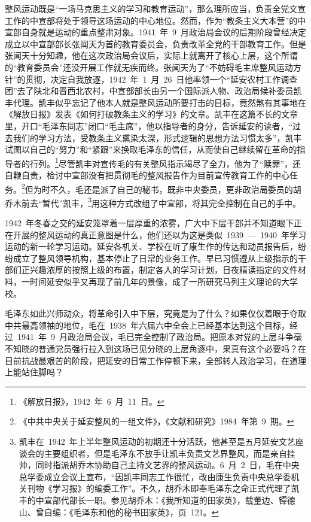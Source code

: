 整风运动既是“一场马克思主义的学习和教育运动”，那么理所应当，负责全党文宣工作的中宣部将处于领导这场运动的中心地位。然而，作为“教条主义大本营”的中宣部自身就是运动的重点整肃对象。1941~年~9~月政治局会议的后期阶段曾经决定成立以中宣部部长张闻天为首的教育委员会，负责改革全党的干部教育工作。但是张闻天十分知趣，他在这次政治局会议后，实际上就离开了核心上层，这个所谓的“教育委员会”还没开展工作就无疾而终。张闻天为了“不妨碍毛主席整风运动方针”的贯彻，决定自我放逐，1942~年~1~月~26~日他率领一个“延安农村工作调查团”去了陕北和晋西北农村，中宣部部长由另一个国际派人物、政治局候补委员凯丰代理。凯丰似乎忘记了他本人就是整风运动所要打击的目标，竟然煞有其事地在《解放日报》发表《如何打破教条主义的学习》的文章。凯丰在这篇不长的文章里，开口“毛泽东同志”闭口“毛主席”，他以指导者的身分，告诉延安的读者，“过去我们的学习方法，受教条主义熏染太深，形式逻辑的思想方法习惯太多”，凯丰试图以自己的“努力”和“紧跟”来换取毛泽东的信任，从而使自己继续留在革命的指导者的行列。\footnote{《解放日报》，1942~年~6~月~11~日。}尽管凯丰对宣传毛的有关整风指示竭尽了全力，他为了“赎罪”，还自鞭自责，检讨中宣部没有把贯彻毛的整风报告作为目前宣传教育工作的中心任务。\footnote{《中共中央关于延安整风的一组文件》，《文献和研究》1984~年第~9~期。}但为时不久，毛还是派了自己的秘书，既非中央委员，更非政治局委员的胡乔木前去“暂代”凯丰，\footnote{凯丰在~1942~年上半年整风运动的初期还十分活跃，他甚至是五月延安文艺座谈会的主要组织者，但是毛泽东不放手让凯丰负责文艺界整风，而是亲自挂帅，同时指派胡乔木协助自己主持文艺界的整风运动。6~月~2~日，毛在中央总学委成立会议上宣布，“因凯丰同志工作很忙，改由康生负责中央总学委机关刊物《学习报》的编委工作”。不久，胡乔木即奉毛泽东之命正式代理了凯丰的中宣部代部长一职。参见胡乔木：《我所知道的田家英》，载董边、镡德山、曾自编：《毛泽东和他的秘书田家英》，页~121。}用这种方式改组了中宣部，将其完全控制在自己的手中。

1942~年冬春之交的延安笼罩着一层厚重的浓雾，广大中下层干部并不知道眼下正在开展的整风运动的真正意图是什么，他们还以为这是类似~1939~—~1940~年学习运动的新一轮学习运动。延安各机关、学校在听了康生作的传达和动员报告后，纷纷成立了整风领导机构，基本停止了日常的业务工作。早已习惯遵从上级指示的干部们正兴趣浓厚的按照上级的布置，制定各人的学习计划，日夜精读指定的文件材料，一时间延安似乎又再现了前几年的景像，成了一所研究马列主义理论的大学校。

毛泽东如此兴师动众，将革命引入中下层，究竟是为了什么？如果仅仅着眼于夺取中共最高领袖的地位，毛在~1938~年六届六中全会上已经基本达到这个目标，经过~1941~年~9~月政治局会议，毛已完全控制了政治局。把原本对党的上层斗争毫不知晓的普通党员强行拉入到这场已见分晓的上层角逐中，果真有这个必要吗？在目前抗战最艰苦的阶段，把延安的日常工作停顿下来，全部转人政治学习，在道理上能站住脚吗？

